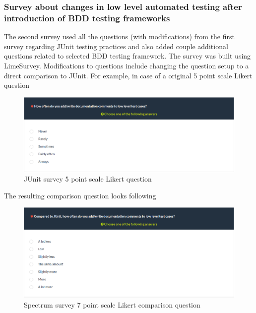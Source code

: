     \subsubsection{Survey about changes in low level automated testing after introduction of BDD testing frameworks}
    The second survey used all the questions (with modifications) from the first survey regarding JUnit testing practices and
    also added couple additional questions related to selected BDD testing framework. The survey was built using LimeSurvey.
    Modifications to questions include changing the question setup to a direct comparison to JUnit.
    For example, in case of a original 5 point scale Likert question
    \begin{figure}[H]
      \begin{center}
        \includegraphics[width=13.7cm]{images/survey-org-comments.png}
        \caption{JUnit survey 5 point scale Likert question}
        \label{fig:survey-junit-comments}
      \end{center}
    \end{figure}
    \begin{addmargin}[0em]{0em}
    The resulting comparison question looks following
    \end{addmargin}
    \begin{figure}[H]
      \begin{center}
        \includegraphics[width=13.7cm]{images/survey-bdd-comments.png}
        \caption{Spectrum survey 7 point scale Likert comparison question}
        \label{fig:survey-bdd-comments}
      \end{center}
    \end{figure}

